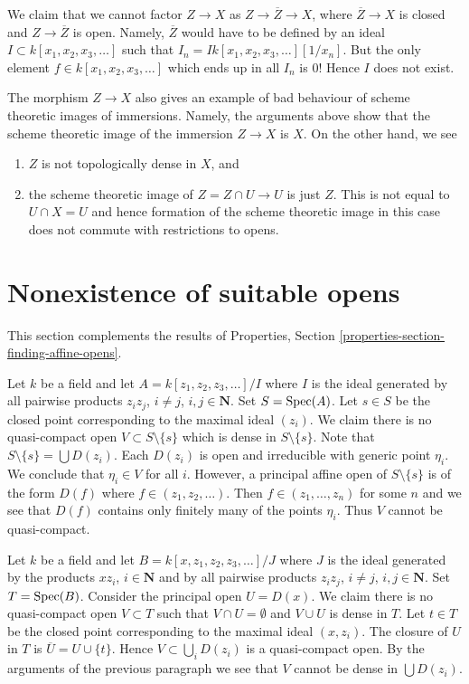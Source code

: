 \medskip\noindent
We claim that we cannot factor $Z \to X$ as
$Z \to \overline{Z} \to X$, where $\overline{Z} \to X$ is closed
and $Z \to \overline{Z}$ is open. Namely, $\overline{Z}$ would
have to be defined by an ideal $I \subset k[x_1, x_2, x_3, \ldots]$
such that $I_n = I k[x_1, x_2, x_3, \ldots][1/x_n]$.
But the only element $f \in k[x_1, x_2, x_3, \ldots]$
which ends up in all $I_n$ is $0$! Hence $I$ does not exist.

\medskip\noindent
The morphism $Z \to X$ also gives an example of bad behaviour
of scheme theoretic images of immersions. Namely, the arguments above
show that the scheme theoretic image of the immersion $Z \to X$ is $X$.
On the other hand, we see
\begin{enumerate}
\item $Z$ is not topologically dense in $X$, and
\item the scheme theoretic image of $Z = Z \cap U \to U$ is just
$Z$. This is not equal to $U \cap X = U$ and hence formation
of the scheme theoretic image in this case
does not commute with restrictions to opens.
\end{enumerate}






\section{Nonexistence of suitable opens}
\label{section-nonexistence-opens}

\noindent
This section complements the results of
Properties, Section \ref{properties-section-finding-affine-opens}.

\medskip\noindent
Let $k$ be a field and let $A = k[z_1, z_2, z_3, \ldots]/I$ where $I$
is the ideal generated by all pairwise products
$z_iz_j$, $i \not = j$, $i, j \in \mathbf{N}$. Set $S = \mathop{\mathrm{Spec}}(A)$.
Let $s \in S$ be the closed point corresponding to the maximal
ideal $(z_i)$. We claim there is no
quasi-compact open $V \subset S \setminus \{s\}$ which is
dense in $S \setminus \{s\}$. Note that $S \setminus \{s\} = \bigcup D(z_i)$.
Each $D(z_i)$ is open and irreducible with generic point
$\eta_i$. We conclude that $\eta_i \in V$ for all $i$.
However, a principal affine open of $S \setminus \{s\}$ is
of the form $D(f)$ where $f \in (z_1, z_2, \ldots)$. Then
$f \in (z_1, \ldots, z_n)$ for some $n$ and we see that $D(f)$ contains
only finitely many of the points $\eta_i$. Thus $V$ cannot be quasi-compact.

\medskip\noindent
Let $k$ be a field and let $B = k[x, z_1, z_2, z_3, \ldots]/J$ where $J$
is the ideal generated by the products $xz_i$, $i \in \mathbf{N}$ and by
all pairwise products $z_iz_j$, $i \not = j$, $i, j \in \mathbf{N}$.
Set $T = \mathop{\mathrm{Spec}}(B)$. Consider the principal open $U = D(x)$.
We claim there is no quasi-compact open $V \subset T$ such that
$V \cap U = \emptyset$ and $V \cup U$ is dense in $T$.
Let $t \in T$ be the closed point corresponding to the maximal
ideal $(x, z_i)$. The closure of $U$ in $T$ is
$\overline{U} = U \cup \{t\}$. Hence $V \subset \bigcup_i D(z_i)$
is a quasi-compact open. By the arguments of the previous paragraph
we see that $V$ cannot be dense in $\bigcup D(z_i)$.


